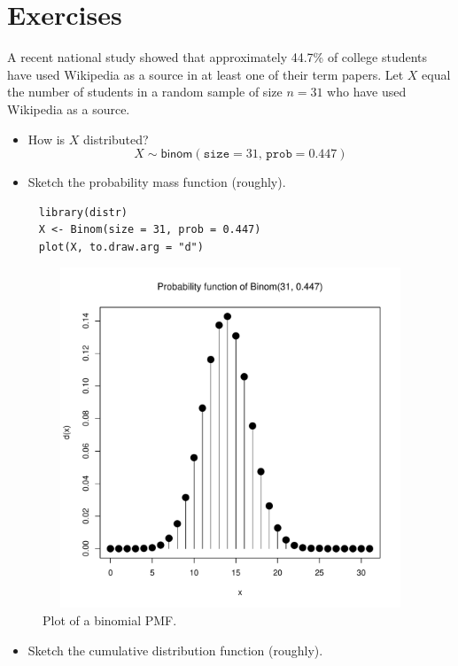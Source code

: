 \documentclass[captions=tableheading]{scrbook}
\begin{document}
\section{Exercises}
\label{sec-5-8}

\setcounter{thm}{0}

\begin{xca}
A recent national study showed that approximately 44.7\% of college students have used Wikipedia as a source in at least one of their term papers. Let \(X\) equal the number of students in a random sample of size \(n=31\) who have used Wikipedia as a source. 
\begin{itemize}
\item How is \(X\) distributed? 
     \[
     X\sim\mathsf{binom}(\mathtt{size}=31,\,\mathtt{prob}=0.447)
     \]
\item Sketch the probability mass function (roughly).
\end{itemize}

\begin{verbatim}
     library(distr)
     X <- Binom(size = 31, prob = 0.447)
     plot(X, to.draw.arg = "d")
\end{verbatim}


     \begin{figure}[th]
	      \includegraphics[width=5in, height=4in]{img/binomdxca.pdf}
	      \caption[Plot of a binomial PMF]{\small Plot of a binomial PMF.}
	      \label{fig:binomdxca}
	    \end{figure}

\begin{itemize}
\item Sketch the cumulative distribution function (roughly).
\end{itemize}


\end{xca}
\end{document}
